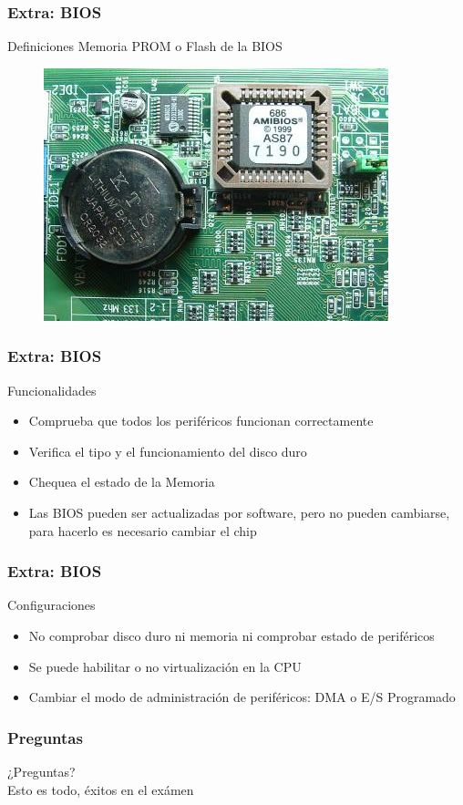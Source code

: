 \documentclass{beamer}
\begin{document}
\begin{frame}
	\frametitle{Extra: BIOS}
	\begin{block}{Definiciones}
		Memoria PROM o Flash de la BIOS
	\end{block}	
	\begin{figure}[H]
		\centering
		\includegraphics[scale=0.4]{imagenes/bios.jpg} 
	\end{figure}
\end{frame}


\begin{frame}
	\frametitle{Extra: BIOS}
	\begin{block}{Funcionalidades}
	\begin{itemize}
		\item Comprueba que todos los periféricos funcionan correctamente
		\item Verifica el tipo y el funcionamiento del disco duro
		\item Chequea el estado de la Memoria 
		\item Las BIOS pueden ser actualizadas por software, pero no pueden cambiarse, para hacerlo es necesario cambiar el chip
	\end{itemize}
	\end{block}	
\end{frame}


\begin{frame}
	\frametitle{Extra: BIOS}
	\begin{block}{Configuraciones}
	\begin{itemize}
		\item No comprobar disco duro ni memoria ni comprobar estado de periféricos
		\item Se puede habilitar o no virtualización en la CPU
		\item Cambiar el modo de administración de periféricos: DMA o E/S Programado
	\end{itemize}
	\end{block}	
\end{frame}

 
\begin{frame}
	\frametitle{Preguntas}
	\vfill
	\begin{center}
	¿Preguntas?\\
	\vfill
	Esto es todo, éxitos en el exámen
	\end{center}
\end{frame}
\end{document}
